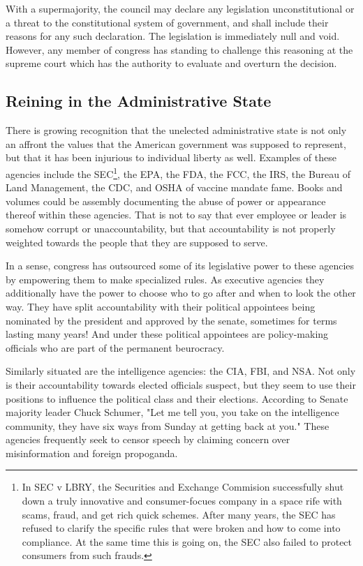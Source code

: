 \documentclass{article}
\begin{document}
\begin{quoting}
With a supermajority, the council may declare any legislation unconstitutional or a threat to the constitutional system of government, and shall include their reasons for any such declaration. The legislation is immediately null and void. However, any member of congress has standing to challenge this reasoning at the supreme court which has the authority to evaluate and overturn the decision.
\end{quoting}

\subsection{Reining in the Administrative State}

There is growing recognition that the unelected administrative state is not only an affront the values that the American government was supposed to represent, but that it has been injurious to individual liberty as well. Examples of these agencies include the SEC\footnote{In SEC v LBRY, the Securities and Exchange Commision successfully shut down\cite{Barash} a truly innovative and consumer-focues company in a space rife with scams, fraud, and get rich quick schemes. After many years, the SEC has refused to clarify the specific rules that were broken and how to come into compliance. At the same time this is going on, the SEC also failed to protect consumers from such frauds.}, the EPA, the FDA, the FCC, the IRS, the Bureau of Land Management, the CDC, and OSHA of vaccine mandate fame. Books and volumes could be assembly documenting the abuse of power or appearance thereof within these agencies. That is not to say that ever employee or leader is somehow corrupt or unaccountability, but that accountability is not properly weighted towards the people that they are supposed to serve.

In a sense, congress has outsourced some of its legislative power to these agencies by empowering them to make specialized rules. As executive agencies they additionally have the power to choose who to go after and when to look the other way. They have split accountability with their political appointees being nominated by the president and approved by the senate, sometimes for terms lasting many years! And under these political appointees are policy-making officials who are part of the permanent beurocracy.

Similarly situated are the intelligence agencies: the CIA, FBI, and NSA. Not only is their accountability towards elected officials suspect, but they seem to use their positions to influence the political class and their elections. According to Senate majority leader Chuck Schumer\cite{ACLU}, "Let me tell you, you take on the intelligence community, they have six ways from Sunday at getting back at you." These agencies frequently seek to censor speech by claiming concern over misinformation and foreign propoganda\cite{Myers}.
\end{document}
